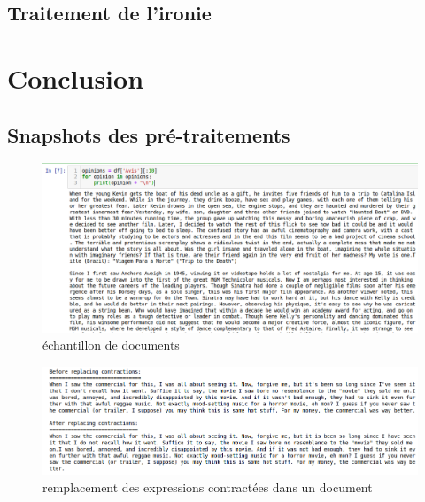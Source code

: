 \documentclass[12pt,a4paper]{report}
\theoremstyle{definition}
\begin{document}
\section{Traitement de l'ironie}

\chapter{Conclusion}

\begin{appendices}
\chapter{Snapshots des pré-traitements}
\begin{figure}[!ht]
  \centering
  \includegraphics[scale=0.4]{images/snapshots/preprocessing/documents_sample.png}
  \caption{échantillon de documents}
  \label{fig:document_sample}
\end{figure}

\begin{figure}[!ht]
  \centering
  \includegraphics[scale=0.4]{images/snapshots/preprocessing/replace_contractions.png}
  \caption{remplacement des expressions contractées dans un document}
  \label{fig:replace_contractions}
\end{figure}


\end{appendices}
\end{document}
